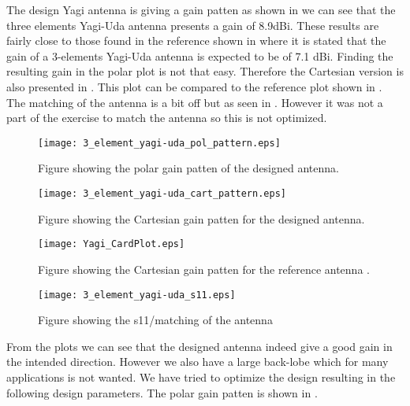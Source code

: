 The design Yagi antenna is giving a gain patten as shown in  we can see that the three elements Yagi-Uda antenna presents a gain of 8.9dBi. These results are fairly close to those found in the reference shown in  where it is stated that the gain of a 3-elements Yagi-Uda antenna is expected to be of 7.1 dBi. Finding the resulting gain in the polar plot is not that easy. Therefore the Cartesian version is also presented in . This plot can be compared to the reference plot shown in . The matching of the antenna is a bit off but as seen in . However it was not a part of the exercise to match the antenna so this is not optimized. 

\begin{figure}[!h]
  \centering
  \texttt{[image: 3\_element\_yagi-uda\_pol\_pattern.eps]}
  \caption{Figure showing the polar gain patten of the designed antenna.}
  \label{fig:3_element_yagi-uda_pol_pattern}
\end{figure}

\begin{figure}[!h]
  \centering
  \texttt{[image: 3\_element\_yagi-uda\_cart\_pattern.eps]}
  \caption{Figure showing the Cartesian gain patten for the designed antenna.}
  \label{fig:3_element_yagi-uda_cart_pattern}
\end{figure}

\begin{figure}[!h]
  \centering
  \texttt{[image: Yagi\_CardPlot.eps]}
  \caption{Figure showing the Cartesian gain patten for the reference antenna \cite[p.~12]{lit:NBS}.}
  \label{fig:Yagi_CardPlot}
\end{figure}

\begin{figure}[!h]
  \centering
  \texttt{[image: 3\_element\_yagi-uda\_s11.eps]}
  \caption{Figure showing the s11/matching of the antenna}
  \label{fig:3_element_yagi-uda_s11}
\end{figure}
\FloatBarrier

From the plots we can see that the designed antenna indeed give a good gain in the intended direction. However we also have a large back-lobe which for many applications is not wanted. We have tried to optimize the design resulting in the following design parameters. The polar gain patten is shown in .

